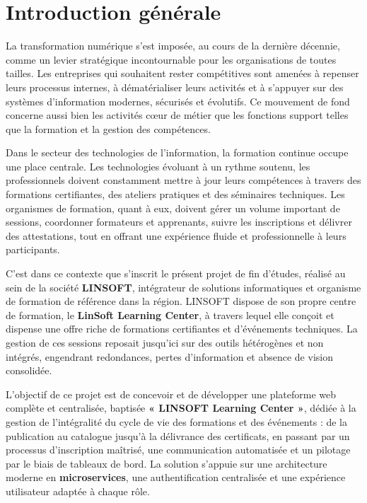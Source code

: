 \documentclass[12pt,a4paper,oneside]{report}
\begin{document}

\chapter*{Introduction générale}

La transformation numérique s'est imposée, au cours de la dernière décennie, comme un levier
stratégique incontournable pour les organisations de toutes tailles. Les entreprises qui
souhaitent rester compétitives sont amenées à repenser leurs processus internes, à
dématérialiser leurs activités et à s'appuyer sur des systèmes d'information modernes,
sécurisés et évolutifs. Ce mouvement de fond concerne aussi bien les activités cœur de métier
que les fonctions support telles que la formation et la gestion des compétences.

Dans le secteur des technologies de l'information, la formation continue occupe une place
centrale. Les technologies évoluant à un rythme soutenu, les professionnels doivent
constamment mettre à jour leurs compétences à travers des formations certifiantes, des
ateliers pratiques et des séminaires techniques. Les organismes de formation, quant à eux,
doivent gérer un volume important de sessions, coordonner formateurs et apprenants, suivre les
inscriptions et délivrer des attestations, tout en offrant une expérience fluide et
professionnelle à leurs participants.

C'est dans ce contexte que s'inscrit le présent projet de fin d'études, réalisé au sein de la
société \textbf{LINSOFT}, intégrateur de solutions informatiques et organisme de formation de
référence dans la région. LINSOFT dispose de son propre centre de formation, le
\textbf{LinSoft Learning Center}, à travers lequel elle conçoit et dispense une offre riche de
formations certifiantes et d'événements techniques. La gestion de ces sessions reposait
jusqu'ici sur des outils hétérogènes et non intégrés, engendrant redondances, pertes
d'information et absence de vision consolidée.

L'objectif de ce projet est de concevoir et de développer une plateforme web complète et
centralisée, baptisée \textbf{« LINSOFT Learning Center »}, dédiée à la gestion de
l'intégralité du cycle de vie des formations et des événements : de la publication au
catalogue jusqu'à la délivrance des certificats, en passant par un processus d'inscription
maîtrisé, une communication automatisée et un pilotage par le biais de tableaux de bord. La
solution s'appuie sur une architecture moderne en \textbf{microservices}, une authentification
centralisée et une expérience utilisateur adaptée à chaque rôle.
\end{document}
